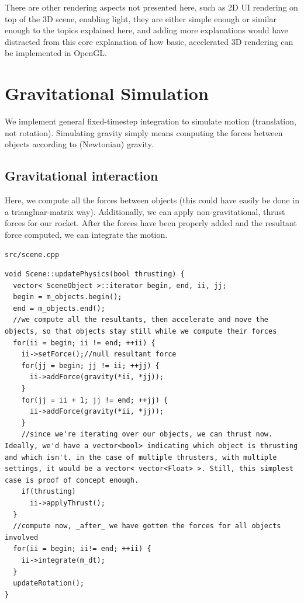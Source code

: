 \documentclass{scrartcl}
\begin{document}
There are other rendering aspects not presented here, such as 2D UI rendering on top of the 3D scene, enabling light, they are either simple enough or similar enough to the topics explained here, and adding more explanations would have distracted from this core explanation of how basic, accelerated 3D rendering can be implemented in OpenGL.

\section{Gravitational Simulation}
We implement general fixed-timestep integration to simulate motion (translation, not rotation). Simulating gravity simply means computing the forces between objects according to (Newtonian) gravity.

\subsection{Gravitational interaction}

Here, we compute all the forces between objects (this could have easily be done in a triangluar-matrix way). Additionally, we can apply non-gravitational, thrust forces for our rocket. After the forces have been properly added and the resultant force computed, we can integrate the motion.

\lstinline{src/scene.cpp}
\begin{lstlisting}
void Scene::updatePhysics(bool thrusting) {
  vector< SceneObject >::iterator begin, end, ii, jj;
  begin = m_objects.begin();
  end = m_objects.end();
  //we compute all the resultants, then accelerate and move the objects, so that objects stay still while we compute their forces
  for(ii = begin; ii != end; ++ii) {
    ii->setForce();//null resultant force
    for(jj = begin; jj != ii; ++jj) {
      ii->addForce(gravity(*ii, *jj));
    }
    for(jj = ii + 1; jj != end; ++jj) {
      ii->addForce(gravity(*ii, *jj));
    }
    //since we're iterating over our objects, we can thrust now. Ideally, we'd have a vector<bool> indicating which object is thrusting and which isn't. in the case of multiple thrusters, with multiple settings, it would be a vector< vector<Float> >. Still, this simplest case is proof of concept enough. 
    if(thrusting)
      ii->applyThrust();
  }
  //compute now, _after_ we have gotten the forces for all objects involved
  for(ii = begin; ii!= end; ++ii) {
    ii->integrate(m_dt);
  }
  updateRotation();
}
\end{lstlisting}
\end{document}
